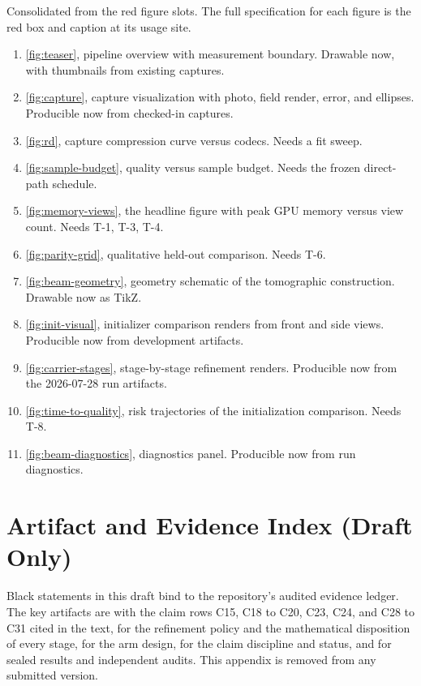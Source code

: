 Consolidated from the red figure slots.  The full specification for each figure is the red
box and caption at its usage site.
\begin{enumerate}[leftmargin=1.8em,itemsep=1pt]
  \item \cref{fig:teaser}, pipeline overview with measurement boundary.  Drawable now,
        with thumbnails from existing captures.
  \item \cref{fig:capture}, capture visualization with photo, field render, error, and
        ellipses.  Producible now from checked-in captures.
  \item \cref{fig:rd}, capture compression curve versus codecs.  Needs a fit sweep.
  \item \cref{fig:sample-budget}, quality versus sample budget.  Needs the frozen
        direct-path schedule.
  \item \cref{fig:memory-views}, the headline figure with peak GPU memory versus view
        count.  Needs T-1, T-3, T-4.
  \item \cref{fig:parity-grid}, qualitative held-out comparison.  Needs T-6.
  \item \cref{fig:beam-geometry}, geometry schematic of the tomographic construction.
        Drawable now as TikZ.
  \item \cref{fig:init-visual}, initializer comparison renders from front and side views.
        Producible now from development artifacts.
  \item \cref{fig:carrier-stages}, stage-by-stage refinement renders.  Producible now from
        the 2026-07-28 run artifacts.
  \item \cref{fig:time-to-quality}, risk trajectories of the initialization comparison.
        Needs T-8.
  \item \cref{fig:beam-diagnostics}, diagnostics panel.  Producible now from run
        diagnostics.
\end{enumerate}

\section{Artifact and Evidence Index (Draft Only)}
\label{sec:artifact-index}

Black statements in this draft bind to the repository's audited evidence ledger.  The key
artifacts are  with the claim rows C15, C18 to C20, C23,
C24, and C28 to C31 cited in the text,  for
the refinement policy and the mathematical disposition of every stage,
 for the arm design,
 for the claim discipline and status, and
 for sealed results and independent audits.  This appendix
is removed from any submitted version.
